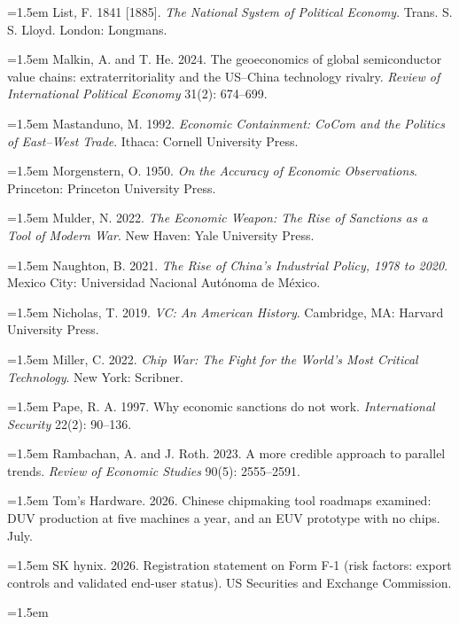 \documentclass[12pt]{article}
\begin{document}
\par\noindent\hangindent=1.5em 
  List, F. 1841 {[}1885{]}. \emph{The National System of Political Economy}. Trans. S. S. Lloyd. London: Longmans.
\par\noindent\hangindent=1.5em 
  Malkin, A. and T. He. 2024. The geoeconomics of global semiconductor value chains: extraterritoriality and the US--China technology rivalry. \emph{Review of International Political Economy} 31(2): 674--699.
\par\noindent\hangindent=1.5em 
  Mastanduno, M. 1992. \emph{Economic Containment: CoCom and the Politics of East--West Trade}. Ithaca: Cornell University Press.
\par\noindent\hangindent=1.5em 
  Morgenstern, O. 1950. \emph{On the Accuracy of Economic Observations}. Princeton: Princeton University Press.
\par\noindent\hangindent=1.5em 
  Mulder, N. 2022. \emph{The Economic Weapon: The Rise of Sanctions as a Tool of Modern War}. New Haven: Yale University Press.
\par\noindent\hangindent=1.5em 
  Naughton, B. 2021. \emph{The Rise of China's Industrial Policy, 1978 to 2020}. Mexico City: Universidad Nacional Autónoma de México.
\par\noindent\hangindent=1.5em 
  Nicholas, T. 2019. \emph{VC: An American History}. Cambridge, MA: Harvard University Press.
\par\noindent\hangindent=1.5em 
  Miller, C. 2022. \emph{Chip War: The Fight for the World's Most Critical Technology}. New York: Scribner.
\par\noindent\hangindent=1.5em 
  Pape, R. A. 1997. Why economic sanctions do not work. \emph{International Security} 22(2): 90--136.
\par\noindent\hangindent=1.5em 
  Rambachan, A. and J. Roth. 2023. A more credible approach to parallel trends. \emph{Review of Economic Studies} 90(5): 2555--2591.
\par\noindent\hangindent=1.5em 
  Tom's Hardware. 2026. Chinese chipmaking tool roadmaps examined: DUV production at five machines a year, and an EUV prototype with no chips. July.
\par\noindent\hangindent=1.5em 
  SK hynix. 2026. Registration statement on Form F-1 (risk factors: export controls and validated end-user status). US Securities and Exchange Commission.
\par\noindent\hangindent=1.5em 
\end{document}
